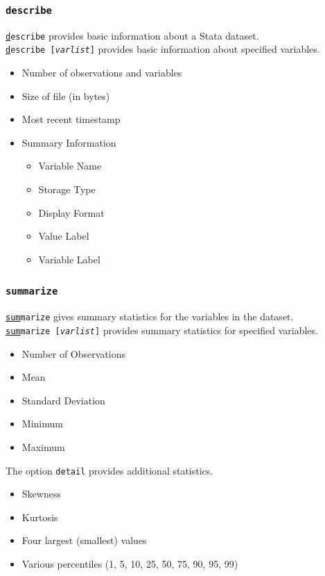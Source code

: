 \documentclass{beamer}
\begin{document}
\begin{frame}
	\frametitle{\texttt{describe}}
		\texttt{\underline{d}escribe} provides basic information about a Stata dataset. \\
		\texttt{\underline{d}escribe [\textit{varlist}]} provides basic information about specified variables.
			\begin{itemize}
			\item Number of observations and variables
			\item Size of file (in bytes)
			\item Most recent timestamp
			\item Summary Information
				\begin{itemize}
					\item Variable Name
					\item Storage Type
					\item Display Format
					\item Value Label
					\item Variable Label
				\end{itemize}
			\end{itemize}
\end{frame}

\begin{frame}
	\frametitle{\texttt{summarize}} 
		\texttt{\underline{sum}marize} gives summary statistics for the variables in the dataset. \\
		\texttt{\underline{sum}marize [\textit{varlist}]} provides summary statistics for specified variables.
			\begin{itemize}
				\item Number of Observations
				\item Mean
				\item Standard Deviation
				\item Minimum
				\item Maximum
			\end{itemize}
		The option \texttt{detail} provides additional statistics.
			\begin{itemize}
				\item Skewness
				\item Kurtosis
				\item Four largest (smallest) values
				\item Various percentiles (1, 5, 10, 25, 50, 75, 90, 95, 99)
			\end{itemize}
\end{frame}
\end{document}
